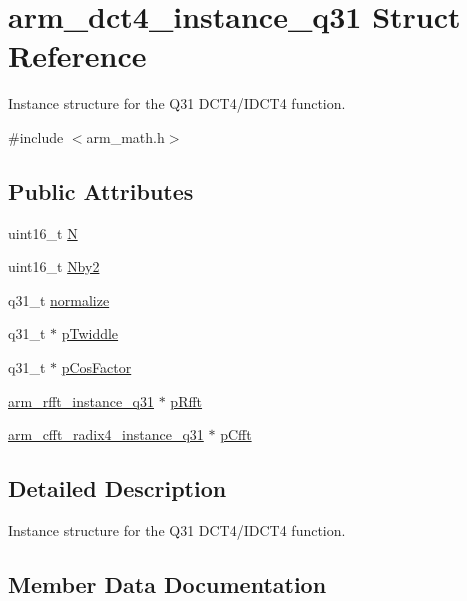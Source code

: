 \hypertarget{structarm__dct4__instance__q31}{}\section{arm\+\_\+dct4\+\_\+instance\+\_\+q31 Struct Reference}
\label{structarm__dct4__instance__q31}


Instance structure for the Q31 D\+C\+T4/\+I\+D\+C\+T4 function.  




{\ttfamily \#include $<$arm\+\_\+math.\+h$>$}

\subsection*{Public Attributes}
\begin{DoxyCompactItemize}
\item 
uint16\+\_\+t \hyperlink{structarm__dct4__instance__q31_a46a9f136457350676e2bfd3768ff9d6d}{N}
\item 
uint16\+\_\+t \hyperlink{structarm__dct4__instance__q31_a32d3268ba4629908dba056599f0a904d}{Nby2}
\item 
q31\+\_\+t \hyperlink{structarm__dct4__instance__q31_ac80ff7b28fca36aeef74dea12e8312dd}{normalize}
\item 
q31\+\_\+t $\ast$ \hyperlink{structarm__dct4__instance__q31_a7db236e22673146bb1d2c962f0713f08}{p\+Twiddle}
\item 
q31\+\_\+t $\ast$ \hyperlink{structarm__dct4__instance__q31_af97204d1838925621fc82021a0c2d6c1}{p\+Cos\+Factor}
\item 
\hyperlink{structarm__rfft__instance__q31}{arm\+\_\+rfft\+\_\+instance\+\_\+q31} $\ast$ \hyperlink{structarm__dct4__instance__q31_af1487dab5e7963b85dc0fdc6bf492542}{p\+Rfft}
\item 
\hyperlink{structarm__cfft__radix4__instance__q31}{arm\+\_\+cfft\+\_\+radix4\+\_\+instance\+\_\+q31} $\ast$ \hyperlink{structarm__dct4__instance__q31_ac96579cfb28d08bb11dd2fe4c6303833}{p\+Cfft}
\end{DoxyCompactItemize}


\subsection{Detailed Description}
Instance structure for the Q31 D\+C\+T4/\+I\+D\+C\+T4 function. 

\subsection{Member Data Documentation}
